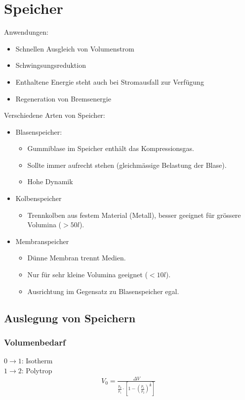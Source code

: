 \section{Speicher}
Anwendungen:\begin{itemize}
\item Schnellen Ausgleich von Volumenstrom 
\item Schwingsungsreduktion
\item Enthaltene Energie steht auch bei Stromausfall zur Verfügung
\item Regeneration von Bremsenergie
\end{itemize}

Verschiedene Arten von Speicher:
\begin{itemize}
\item Blasenspeicher:
\begin{itemize}
\item Gummiblase im Speicher enthält das Kompressionsgas.
\item  Sollte immer aufrecht stehen (gleichmässige Belastung der Blase).
\item Hohe Dynamik
\end{itemize}
\item Kolbenspeicher
\begin{itemize}
\item Trennkolben aus festem Material (Metall), besser geeignet für grössere Volumina ($>50 l$). 
\end{itemize}
\item Membranspeicher
\begin{itemize}
\item Dünne Membran trennt Medien.
\item Nur für sehr kleine Volumina geeignet ($<10 l$). 
\item Ausrichtung im Gegensatz zu Blasenspeicher egal. 
\end{itemize}
\end{itemize}


\subsection{Auslegung von Speichern}
\subsubsection{Volumenbedarf}
$0 \rightarrow 1$: Isotherm \\
 $1 \rightarrow 2$: Polytrop
\begin{align*}
V_0 = \frac{\Delta V}{\frac{p_0}{p_1} \cdot \left[ 1 - \left( \frac{p_1}{p_2} \right) ^{\frac{1}{n}} \right]}
\end{align*}

